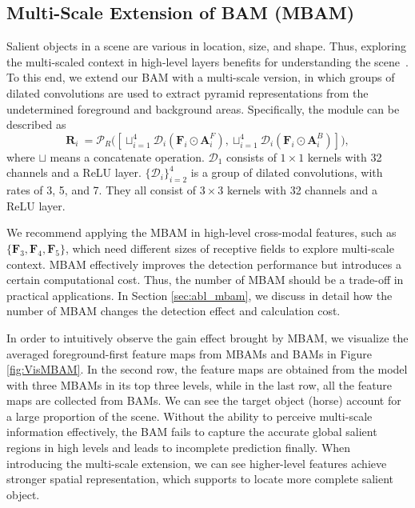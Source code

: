 \documentclass[journal]{IEEEtran}
\newcommand{\secref}[1]{Section \ref{#1}}
\newcommand{\figref}[1]{Figure \ref{#1}}
\begin{document}
\subsection{Multi-Scale Extension of BAM (MBAM)}\label{sec:MBAM}
Salient objects in a scene are various in location, size, and shape.
Thus, exploring the multi-scaled context in high-level layers benefits for understanding the scene~\cite{wang2019salinet,zhao2019pyramid}.
To this end, we extend our BAM with a multi-scale version, in which groups of dilated convolutions are used to extract pyramid representations from the undetermined foreground and background areas.
Specifically, the module can be described as
\begin{equation}
\mathbf{R}_i\ = \mathcal{P}_R\Big(\left[\sqcup_{i=1}^4\mathcal{D}_i\left( \mathbf{F}_i\odot\mathbf{A}^F_i\right),\sqcup_{i=1}^4\mathcal{D}_i\left(\mathbf{F}_i\odot \mathbf{A}^B_i\right)\right]\Big),
\end{equation}
where $\sqcup$ means a concatenate operation.
$\mathcal{D}_1$ consists of $1\times1$ kernels with 32 channels and a ReLU layer.
$\{\mathcal{D}_i\}_{i=2}^4$ is a group of dilated convolutions, with rates of 3, 5, and 7.
They all consist of $3\times3$ kernels with 32 channels and a ReLU layer.

We recommend applying the MBAM in high-level cross-modal features, such as $\{\mathbf{F}_3,\mathbf{F}_4,\mathbf{F}_5\}$,
which need different sizes of receptive fields to explore multi-scale context.
MBAM effectively improves the detection performance but introduces a certain computational cost.
Thus, the number of MBAM should be a trade-off in practical applications. 
In \secref{sec:abl_mbam}, we discuss in detail how the number of MBAM changes the detection effect and calculation cost.


In order to intuitively observe the gain effect brought by MBAM,
we visualize the averaged foreground-first feature maps from MBAMs and BAMs in \figref{fig:VisMBAM}.
In the second row,
the feature maps are obtained from the model with three MBAMs in its top three levels,
while in the last row, 
all the feature maps are collected from BAMs. 
We can see the target object (horse) account for a large proportion of the scene.
Without the ability to perceive multi-scale information effectively,
the BAM fails to capture the accurate global salient regions in high levels
and leads to incomplete prediction finally.
When introducing the multi-scale extension, 
we can see higher-level features achieve stronger spatial representation,
which supports to locate more complete salient object.
\end{document}
